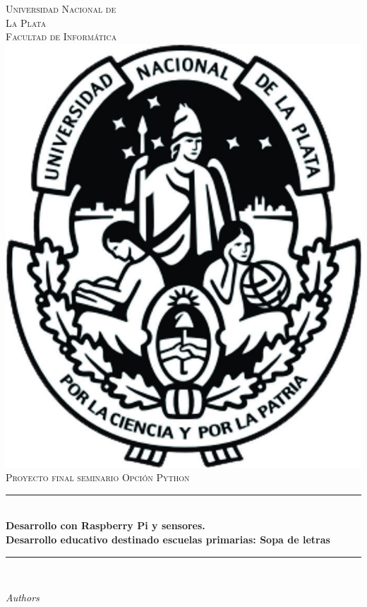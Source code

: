 \newcommand{\HRule}{\rule{\linewidth}{0.5mm}} 

\begin{titlepage}
\center
\textsc{
\Huge{Universidad Nacional de \\La Plata}\\[.5cm]
\Large
Facultad de Informática\\[1cm] 
\includegraphics[scale=0.5]{UNLP}\\[3cm]
Proyecto final seminario Opción Python}\\[.5cm] 

\sffamily
\HRule \\[0.4cm]
\textbf{\Huge Desarrollo con Raspberry Pi y sensores.\\ Desarrollo educativo destinado escuelas primarias: Sopa de letras}\\[0.2cm] 
\HRule \\[3cm]
 
\large
\begin{minipage}[t]{.4\textwidth}
\begin{flushleft}
\emph{Authors}


\end{flushleft}
\end{minipage}
\end{titlepage}
